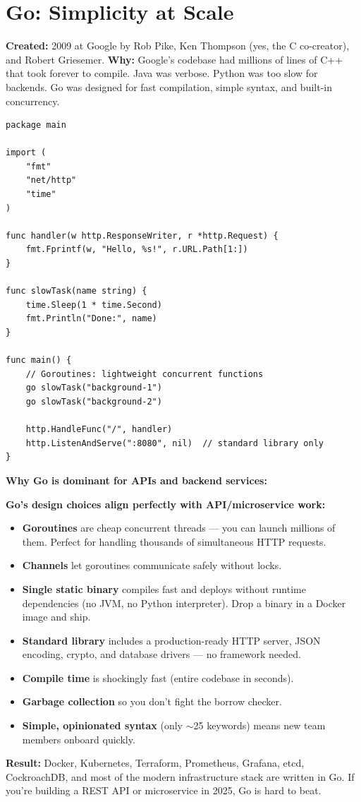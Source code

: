 \documentclass[11pt, letterpaper]{article}
\begin{document}
\section*{Go: Simplicity at Scale}

\textbf{Created:} 2009 at Google by Rob Pike, Ken Thompson (yes, the C co-creator), and Robert Griesemer. \textbf{Why:} Google's codebase had millions of lines of C++ that took forever to compile. Java was verbose. Python was too slow for backends. Go was designed for fast compilation, simple syntax, and built-in concurrency.

\begin{lstlisting}[style=code, caption={Go: HTTP server with goroutines}]
package main

import (
    "fmt"
    "net/http"
    "time"
)

func handler(w http.ResponseWriter, r *http.Request) {
    fmt.Fprintf(w, "Hello, %s!", r.URL.Path[1:])
}

func slowTask(name string) {
    time.Sleep(1 * time.Second)
    fmt.Println("Done:", name)
}

func main() {
    // Goroutines: lightweight concurrent functions
    go slowTask("background-1")
    go slowTask("background-2")

    http.HandleFunc("/", handler)
    http.ListenAndServe(":8080", nil)  // standard library only
}
\end{lstlisting}

\textbf{Why Go is dominant for APIs and backend services:}

\begin{tcolorbox}[colback=part6bg, colframe=sectionred, arc=3pt, boxrule=1pt]
\textbf{Go's design choices align perfectly with API/microservice work:}
\begin{itemize}[noitemsep, leftmargin=*]
  \item \textbf{Goroutines} are cheap concurrent threads --- you can launch millions of them. Perfect for handling thousands of simultaneous HTTP requests.
  \item \textbf{Channels} let goroutines communicate safely without locks.
  \item \textbf{Single static binary} compiles fast and deploys without runtime dependencies (no JVM, no Python interpreter). Drop a binary in a Docker image and ship.
  \item \textbf{Standard library} includes a production-ready HTTP server, JSON encoding, crypto, and database drivers --- no framework needed.
  \item \textbf{Compile time} is shockingly fast (entire codebase in seconds).
  \item \textbf{Garbage collection} so you don't fight the borrow checker.
  \item \textbf{Simple, opinionated syntax} (only $\sim$25 keywords) means new team members onboard quickly.
\end{itemize}
\textbf{Result:} Docker, Kubernetes, Terraform, Prometheus, Grafana, etcd, CockroachDB, and most of the modern infrastructure stack are written in Go. If you're building a REST API or microservice in 2025, Go is hard to beat.
\end{tcolorbox}
\end{document}
